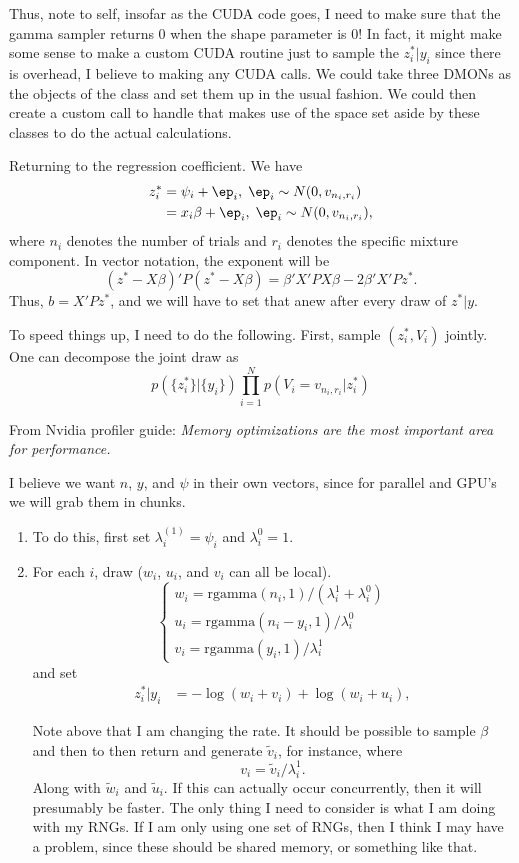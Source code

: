 \documentclass{article}
\begin{document}
Thus, note to self, insofar as the CUDA code goes, I need to make sure that the
gamma sampler returns 0 when the shape parameter is 0!  In fact, it might make
some sense to make a custom CUDA routine just to sample the $z_i^*|y_i$ since
there is overhead, I believe to making any CUDA calls.  We could take three
DMONs as the objects of the class and set them up in the usual fashion.  We
could then create a custom call to handle that makes use of the space set aside
by these classes to do the actual calculations.

Returning to the regression coefficient.  We have
\begin{align*}
z_i^* & = \psi_i + \ep_i, \; \ep_i \sim N(0, v_{n_i,r_i}) \\
& = x_i \beta + \ep_i, \; \ep_i \sim N(0, v_{n_i,r_i}) ,
\end{align*}
where $n_i$ denotes the number of trials and $r_i$ denotes the specific mixture
component.  In vector notation, the exponent will be
\[
(z^* - X \beta)' P (z^* - X \beta) = \beta' X'PX \beta - 2 \beta' X'P z^*.
\]
Thus, $b = X'Pz^*$, and we will have to set that anew after every draw of
$z^*|y$.

To speed things up, I need to do the following.  First, sample $(z_i^*,
V_i)$ jointly.  One can decompose the joint draw as
\[
p(\{z_i^*\} | \{y_i\}) \prod_{i=1}^N p(V_i = v_{n_i,r_i} | z_i^*)
\]

From Nvidia profiler guide: \emph{Memory optimizations are the most important
  area for performance.}

I believe we want $n$, $y$, and $\psi$ in their own vectors, since for parallel
and GPU's we will grab them in chunks.
\begin{enumerate}
\item To do this, first set $\lambda_i^{(1)} = \psi_i$ and $\lambda_i^0 = 1$.

\item For each $i$, draw ($w_i$, $u_i$, and $v_i$ can all be local).
\[
\begin{cases}
w_i = \text{rgamma}(n_i,1) / (\lambda_i^1 + \lambda_i^0) \\
u_i = \text{rgamma}(n_i-y_i, 1) / \lambda_i^0 \\
v_i = \text{rgamma}(y_i, 1) / \lambda_i^1
\end{cases}
\]
and set
\begin{align*}
z_i^*|y_i 
& = - \log(w_i + v_i) + \log(w_i + u_i),
\end{align*}

Note above that I am changing the rate.  It should be possible to sample $\beta$
and then to then return and generate $\tilde v_i$, for instance, where
\[
v_i = \tilde v_i / \lambda_i^1.
\]
Along with $\tilde w_i$ and $\tilde u_i$.  If this can actually occur
concurrently, then it will presumably be faster.  The only thing I need to
consider is what I am doing with my RNGs.  If I am only using one set of RNGs,
then I think I may have a problem, since these should be shared memory, or
something like that.

\end{enumerate}
\end{document}
